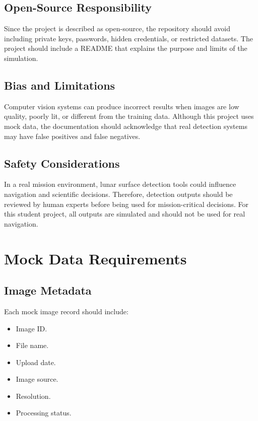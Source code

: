\documentclass[12pt]{article}
\begin{document}
\subsection{Open-Source Responsibility}

Since the project is described as open-source, the repository should avoid including private keys, passwords, hidden credentials, or restricted datasets. The project should include a README that explains the purpose and limits of the simulation.

\subsection{Bias and Limitations}

Computer vision systems can produce incorrect results when images are low quality, poorly lit, or different from the training data. Although this project uses mock data, the documentation should acknowledge that real detection systems may have false positives and false negatives.

\subsection{Safety Considerations}

In a real mission environment, lunar surface detection tools could influence navigation and scientific decisions. Therefore, detection outputs should be reviewed by human experts before being used for mission-critical decisions. For this student project, all outputs are simulated and should not be used for real navigation.

\section{Mock Data Requirements}

\subsection{Image Metadata}

Each mock image record should include:

\begin{itemize}
    \item Image ID.
    \item File name.
    \item Upload date.
    \item Image source.
    \item Resolution.
    \item Processing status.
\end{itemize}
\end{document}
